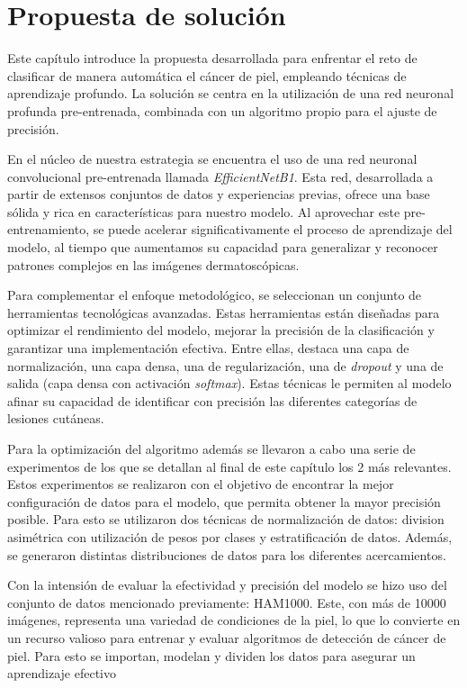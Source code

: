 \chapter{Propuesta de solución}\label{chapter:proposal}

Este capítulo introduce la propuesta desarrollada para enfrentar el reto de clasificar de manera automática el cáncer de piel, empleando técnicas de aprendizaje profundo. La solución se centra en la utilización de una red neuronal profunda pre-entrenada, combinada con un algoritmo propio para el ajuste de precisión.

En el núcleo de nuestra estrategia se encuentra el uso de una red neuronal convolucional pre-entrenada llamada \textit{EfficientNetB1}. Esta red, desarrollada a partir de extensos conjuntos de datos y experiencias previas, ofrece una base sólida y rica en características para nuestro modelo. Al aprovechar este pre-entrenamiento, se puede acelerar significativamente el proceso de aprendizaje del modelo, al tiempo que aumentamos su capacidad para generalizar y reconocer patrones complejos en las imágenes dermatoscópicas.

Para complementar el enfoque metodológico, se seleccionan un conjunto de herramientas tecnológicas avanzadas. Estas herramientas están diseñadas para optimizar el rendimiento del modelo, mejorar la precisión de la clasificación y garantizar una implementación efectiva. Entre ellas, destaca una capa de normalización, una capa densa, una de regularización, una de \textit{dropout} y una de salida (capa densa con activación \textit{softmax}). Estas técnicas le permiten al modelo afinar su capacidad de identificar con precisión las diferentes categorías de lesiones cutáneas.

Para la optimización del algoritmo además se llevaron a cabo una serie de experimentos de los que se detallan al final de este capítulo los 2 más relevantes. Estos experimentos se realizaron con el objetivo de encontrar la mejor configuración de datos para el modelo, que permita obtener la mayor precisión posible. Para esto se utilizaron dos técnicas de normalización de datos: division asimétrica con utilización de pesos por clases y estratificación de datos. Además, se generaron distintas distribuciones de datos para los diferentes acercamientos.

Con la intensión de evaluar la efectividad y precisión del modelo se hizo uso del conjunto de datos mencionado previamente: HAM1000. Este, con más de 10000 imágenes, representa una variedad de condiciones de la piel, lo que lo convierte en un recurso valioso para entrenar y evaluar algoritmos de detección de cáncer de piel. Para esto se importan, modelan y dividen los datos para asegurar un aprendizaje efectivo

